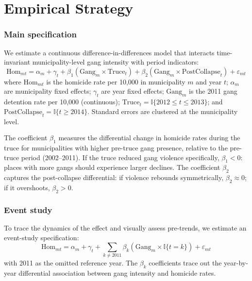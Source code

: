 \documentclass[12pt]{article}
\newcommand{\ind}{\mathbb{I}}
\begin{document}
\begin{table}[H]

\label{tab:summary}
\end{table}


\section{Empirical Strategy}

\subsubsection*{Main specification} We estimate a continuous difference-in-differences model that interacts time-invariant municipality-level gang intensity with period indicators:
\begin{equation}
\text{Hom}_{mt} = \alpha_m + \gamma_t + \beta_1 \left(\text{Gang}_m \times \text{Truce}_t\right) + \beta_2 \left(\text{Gang}_m \times \text{PostCollapse}_t\right) + \varepsilon_{mt}
\label{eq:main}
\end{equation}
where $\text{Hom}_{mt}$ is the homicide rate per 10,000 in municipality $m$ and year $t$; $\alpha_m$ are municipality fixed effects; $\gamma_t$ are year fixed effects; $\text{Gang}_m$ is the 2011 gang detention rate per 10,000 (continuous); $\text{Truce}_t = \ind\{2012 \leq t \leq 2013\}$; and $\text{PostCollapse}_t = \ind\{t \geq 2014\}$. Standard errors are clustered at the municipality level.

The coefficient $\beta_1$ measures the differential change in homicide rates during the truce for municipalities with higher pre-truce gang presence, relative to the pre-truce period (2002--2011). If the truce reduced gang violence specifically, $\beta_1 < 0$: places with more gangs should experience larger declines. The coefficient $\beta_2$ captures the post-collapse differential: if violence rebounds symmetrically, $\beta_2 \approx 0$; if it overshoots, $\beta_2 > 0$.

\subsubsection*{Event study} To trace the dynamics of the effect and visually assess pre-trends, we estimate an event-study specification:
\begin{equation}
\text{Hom}_{mt} = \alpha_m + \gamma_t + \sum_{k \neq 2011} \beta_k \left(\text{Gang}_m \times \ind\{t = k\}\right) + \varepsilon_{mt}
\label{eq:eventstudy}
\end{equation}
with 2011 as the omitted reference year. The $\beta_k$ coefficients trace out the year-by-year differential association between gang intensity and homicide rates.
\end{document}
